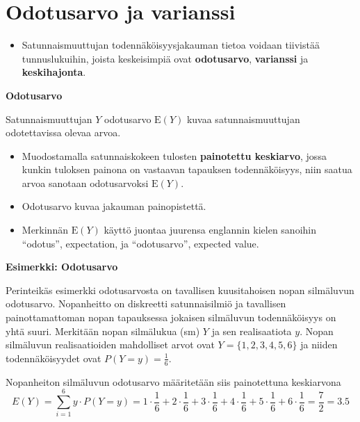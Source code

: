 \documentclass[
]{book}
\providecommand{\tightlist}{%
  \setlength{\itemsep}{0pt}\setlength{\parskip}{0pt}}
\begin{document}
\hypertarget{alaluku44}{%
\section{Odotusarvo ja varianssi}\label{alaluku44}}

\begin{itemize}
\tightlist
\item
  Satunnaismuuttujan todennäköisyysjakauman tietoa voidaan tiivistää tunnuslukuihin, joista keskeisimpiä ovat \textbf{odotusarvo}, \textbf{varianssi} ja \textbf{keskihajonta}.
\end{itemize}

\begin{defblock}{}

\textbf{Odotusarvo}

Satunnaismuuttujan \(Y\) odotusarvo \(\text{E}(Y)\) kuvaa satunnaismuuttujan odotettavissa olevaa arvoa.

\begin{itemize}
\tightlist
\item
  Muodostamalla satunnaiskokeen tulosten \textbf{painotettu keskiarvo}, jossa kunkin tuloksen painona on vastaavan tapauksen todennäköisyys, niin saatua arvoa sanotaan odotusarvoksi \(\text{E}(Y)\).
\item
  Odotusarvo kuvaa jakauman painopistettä.
\item
  Merkinnän \(\text{E}(Y)\) käyttö juontaa juurensa englannin kielen sanoihin ``odotus'', expectation, ja ``odotusarvo'', expected value.
\end{itemize}

\end{defblock}

\begin{eblock}{}
\textbf{Esimerkki: Odotusarvo}

Perinteikäs esimerkki odotusarvosta on tavallisen kuusitahoisen nopan silmäluvun odotusarvo. Nopanheitto on diskreetti satunnaisilmiö ja tavallisen painottamattoman nopan tapauksessa jokaisen silmäluvun todennäköisyys on yhtä suuri. Merkitään nopan silmälukua (sm) \(Y\) ja sen realisaatiota \(y\). Nopan silmäluvun realisaatioiden mahdolliset arvot ovat \(Y = \{1,2,3,4,5,6\}\) ja niiden todennäköisyydet ovat \(P(Y=y) = \frac{1}{6}\).

Nopanheiton silmäluvun odotusarvo määritetään siis painotettuna keskiarvona \[E(Y) = \sum_{i=1}^6 y \cdot P(Y=y)  = 1 \cdot \frac{1}{6} + 2 \cdot \frac{1}{6} + 3 \cdot \frac{1}{6} + 4 \cdot \frac{1}{6} + 5 \cdot \frac{1}{6} + 6 \cdot \frac{1}{6} = \frac{7}{2} = 3.5\]

\end{eblock}
\end{document}
